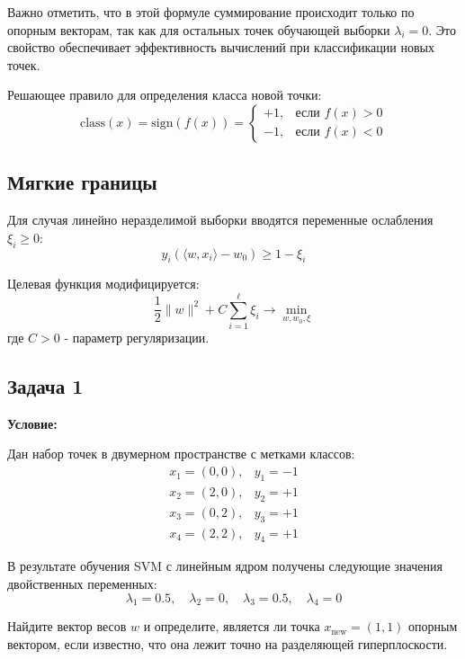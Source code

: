 \par Важно отметить, что в этой формуле суммирование происходит только по опорным векторам, так как для остальных точек обучающей выборки \(\lambda_i = 0\). Это свойство обеспечивает эффективность вычислений при классификации новых точек.

\par Решающее правило для определения класса новой точки:
\begin{equation*}
    \text{class}(x) = \text{sign}(f(x)) =
    \begin{cases}
        +1, & \text{если } f(x) > 0 \\
        -1, & \text{если } f(x) < 0
    \end{cases}
\end{equation*}

\subsection{Мягкие границы}
\par Для случая линейно неразделимой выборки вводятся переменные ослабления \( \xi_i \geq 0 \):
\begin{equation*}
    y_i(\langle w,x_i \rangle - w_0) \geq 1 - \xi_i
\end{equation*}
\par Целевая функция модифицируется:
\begin{equation*}
    \frac{1}{2}\|w\|^2 + C\sum_{i=1}^{\ell} \xi_i \to \min_{w,w_0,\xi}
\end{equation*}
где \( C > 0 \) - параметр регуляризации.

\subsection{Задача 1}
\textbf{Условие:}
\par Дан набор точек в двумерном пространстве с метками классов:
\begin{equation*}
    \begin{array}{ll}
        x_1 = (0,0), & y_1 = -1 \\
        x_2 = (2,0), & y_2 = +1 \\
        x_3 = (0,2), & y_3 = +1 \\
        x_4 = (2,2), & y_4 = +1
    \end{array}
\end{equation*}
\par В результате обучения SVM с линейным ядром получены следующие значения двойственных переменных:
\begin{equation*}
    \lambda_1 = 0.5, \quad \lambda_2 = 0, \quad \lambda_3 = 0.5, \quad \lambda_4 = 0
\end{equation*}
\par Найдите вектор весов \(w\) и определите, является ли точка \(x_{\text{new}} = (1,1)\) опорным вектором, если известно, что она лежит точно на разделяющей гиперплоскости.

